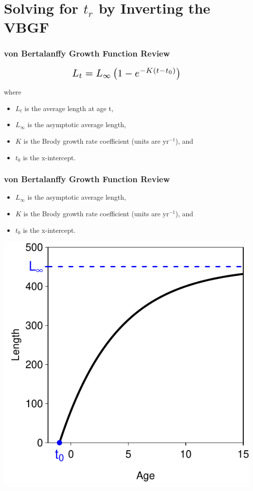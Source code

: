 \documentclass[xcolor=dvipsnames]{beamer}\usepackage[]{graphicx}\usepackage[]{color}
\newenvironment{knitrout}{}{} %
\newcommand*{\Scale}[2][4]{\scalebox{#1}{\ensuremath{#2}}}%
\begin{document}
\section{Solving for $t_{r}$ by Inverting the VBGF}

\begin{frame}[fragile, t]
\frametitle{von Bertalanffy Growth Function Review}

\[\Scale[1.5]{ L_{t} = L_{\infty}\left(1-e^{-K(t-t_{0})}\right) }\]

\bigskip
where
\begin{itemize}
  \item $L_{t}$ is the average length at age t,
  \pause
  \item $L_{\infty}$ is the asymptotic average length,
  \item $K$ is the Brody growth rate coefficient (units are yr$^{-1}$), and
  \item $t_{0}$ is the x-intercept.
\end{itemize}

\end{frame}



\begin{frame}[fragile, t]
\frametitle{von Bertalanffy Growth Function Review}
\begin{itemize}
  \item $L_{\infty}$ is the asymptotic average length,
  \item $K$ is the Brody growth rate coefficient (units are yr$^{-1}$), and
  \item $t_{0}$ is the x-intercept.
\end{itemize}
\bigskip
\begin{knitrout}\footnotesize
{}\color{fgcolor}

{\centering \includegraphics[width=.4\linewidth]{Figs/unnamed-chunk-3-1} 

}



\end{knitrout}
\end{frame}
\end{document}
